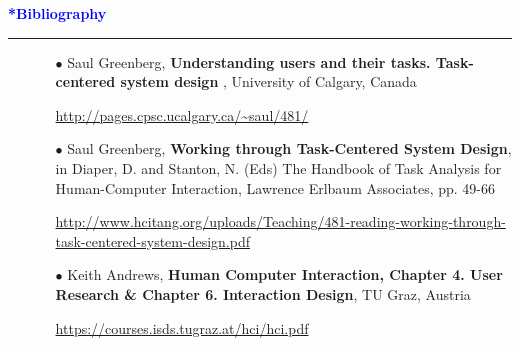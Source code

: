 \documentclass[pdf]{beamer}
\begin{document}
\begin{frame}
	\vspace{8mm}
	\textcolor{Blue}{\textbf{\Large{*Bibliography}}}
    \textcolor{red}{\rule{10cm}{1mm}}

    \begin{itemize}
    	\item[] 
        \begin{itemize}
        	\item[{$\bullet$}] Saul Greenberg, \textbf{Understanding users and their tasks. Task-centered system design }, University of Calgary, Canada

        	\url{http://pages.cpsc.ucalgary.ca/~saul/481/}
\newline        	
	
        	\item[{$\bullet$}] Saul Greenberg, \textbf{Working through Task-Centered System Design}, in Diaper, D. and Stanton, N. (Eds) The Handbook of Task Analysis for Human-Computer Interaction, Lawrence Erlbaum Associates, pp. 49-66
        	
        	\url{http://www.hcitang.org/uploads/Teaching/481-reading-working-through-task-centered-system-design.pdf}
\newline

        	\item[{$\bullet$}] Keith Andrews, \textbf{Human Computer Interaction, Chapter 4. User Research \& Chapter 6. Interaction Design}, TU Graz, Austria

        	\url{https://courses.isds.tugraz.at/hci/hci.pdf}        	
     	\end{itemize}
   	\end{itemize}
\end{frame}
\end{document}
